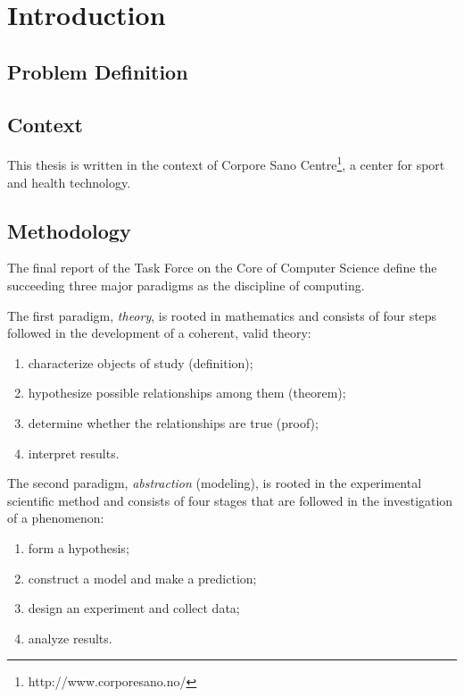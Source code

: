 \chapter{Introduction}\label{ch:introduction}

\section{Problem Definition}\label{sec:problem_definition}

\section{Context}\label{sec:context}
This thesis is written in the context of Corpore Sano Centre\footnote{http://www.corporesano.no/}, a center for sport and health technology.


\newpage\section{Methodology}\label{sec:methodology}
The final report of the Task Force on the Core of Computer Science\cite{computing_as_a_discipline} define the succeeding three major paradigms as the discipline of computing.

The first paradigm, \emph{theory}, is rooted in mathematics and consists of four steps followed in the development of a coherent, valid theory: 
\begin{enumerate}
    \item characterize objects of study (definition);
    \item hypothesize possible relationships among them (theorem);
    \item determine whether the relationships are true (proof); 
    \item interpret results.
\end{enumerate}

The second paradigm, \emph{abstraction} (modeling), is rooted in the experimental scientific method and consists of four stages that are followed in the investigation of a phenomenon: 
\begin{enumerate}
    \item form a hypothesis;
    \item construct a model and make a prediction;
    \item design an experiment and collect data;
    \item analyze results.
\end{enumerate}

